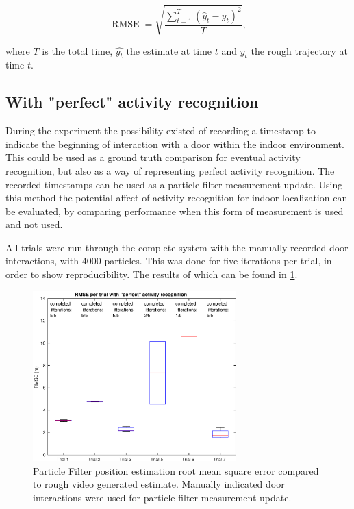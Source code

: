 \begin{equation}
	\displaystyle \operatorname {RMSE} ={\sqrt {\frac {\sum _{t=1}^{T}({\hat {y}}_{t}-y_{t})^{2}}{T}}},
	\label{eq:RMSE}
\end{equation}

where $T$ is the total time, $\hat{y_t}$ the estimate at time $t$ and $y_t$ the rough trajectory at time $t$.
\subsection{With "perfect" activity recognition}
During the experiment the possibility existed of recording a timestamp to indicate the beginning of interaction with a door within the indoor environment. This could be used as a ground truth comparison for eventual activity recognition, but also as a way of representing perfect activity recognition. The recorded timestamps can be used as a particle filter measurement update. Using this method the potential affect of activity recognition for indoor localization can be evaluated, by comparing performance when this form of measurement is used and not used. \par 

All trials were run through the complete system with the manually recorded door interactions, with 4000 particles. This was done for five iterations per trial, in order to show reproducibility. The results of which can be found in \cref{fig:pf_boxplot}.

\begin{figure}[H]
	\centering
	\includegraphics[width=0.7\textwidth]{images/20201118_1212_RMSE_per_trial_with_perfect_activity_recognition}
	\caption[Particle Filter position estimation performance with manual door interaction]{Particle Filter position estimation root mean square error compared to rough video generated estimate. Manually indicated door interactions were used for particle filter measurement update.}	
	\label{fig:pf_boxplot}
\end{figure}

